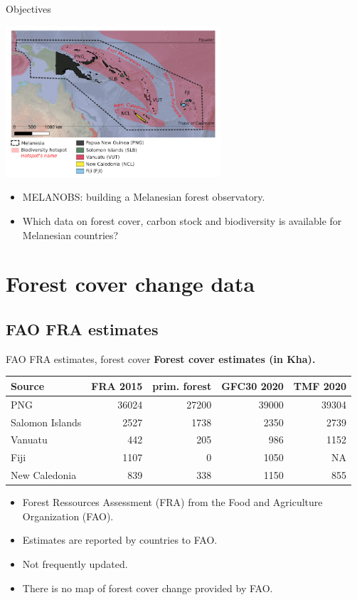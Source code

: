 \documentclass[10pt,table,dvipsnames,compress]{beamer}
\begin{document}
\begin{frame}[label={sec:orge9de18c}]{Objectives}
\begin{center}
\includegraphics[width=8cm]{figs/carte_melanobs.jpg}
\end{center}

\begin{itemize}
\item MELANOBS: building a Melanesian forest observatory.
\item Which data on forest cover, carbon stock and biodiversity is available for Melanesian countries?
\end{itemize}
\end{frame}

\section{Forest cover change data}
\label{sec:org0d5eb83}

\subsection{FAO FRA estimates}
\label{sec:org380aac1}

\begin{frame}[label={sec:org56e2a78}]{FAO FRA estimates, forest cover}
\textbf{Forest cover estimates (in Kha).}

\begin{center}
\begin{tabular}{lrrrr}
Source & FRA 2015 & prim. forest & GFC30 2020 & TMF 2020\\[0pt]
\hline
PNG & 36024 & 27200 & 39000 & 39304\\[0pt]
Salomon Islands & 2527 & 1738 & 2350 & 2739\\[0pt]
Vanuatu & 442 & 205 & 986 & 1152\\[0pt]
Fiji & 1107 & 0 & 1050 & NA\\[0pt]
New Caledonia & 839 & 338 & 1150 & 855\\[0pt]
\end{tabular}
\end{center}

\begin{itemize}
\item Forest Ressources Assessment (FRA) from the Food and Agriculture Organization (FAO).
\item Estimates are reported by countries to FAO.
\item Not frequently updated.
\item There is no map of forest cover change provided by FAO.
\end{itemize}
\end{frame}
\end{document}
